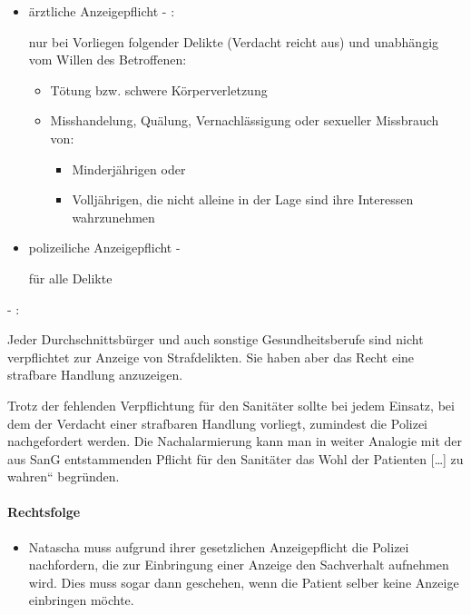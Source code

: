 \begin{itemize}
	\item {\mdseries
	ärztliche Anzeigepflicht - :}

	{\mdseries
	nur bei Vorliegen folgender Delikte (Verdacht reicht aus) und
	unabhängig vom Willen des Betroffenen:}

	\begin{itemize}
		\item {\mdseries
		T\"otung bzw. schwere K\"orperverletzung}

		\item {\mdseries
 		Misshandelung, Quälung, Vernachlässigung oder sexueller Missbrauch
		von:}

		\begin{itemize}
			\item {\mdseries
			Minderjährigen oder}

			\item {\mdseries
			Volljährigen, die nicht alleine in der Lage sind ihre Interessen
			wahrzunehmen}

		\end{itemize}
	\end{itemize}
	
	\item {\mdseries
	polizeiliche Anzeigepflicht - }

	{\mdseries
	f\"ur alle Delikte}

\end{itemize}

{\mdseries
{} - :}

Jeder Durchschnittsb\"urger und auch sonstige Gesundheitsberufe sind
nicht verpflichtet zur Anzeige von Strafdelikten. Sie haben aber das
Recht eine strafbare Handlung anzuzeigen. 

Trotz der fehlenden Verpflichtung f\"ur den Sanitäter sollte bei jedem
Einsatz, bei dem der Verdacht einer strafbaren Handlung vorliegt,
zumindest die Polizei nachgefordert werden. Die Nachalarmierung kann
man in weiter Analogie mit der aus  SanG
entstammenden Pflicht f\"ur den Sanitäter {\quotedblbase}das Wohl der
Patienten [{\dots}] zu wahren{\textquotedblleft} begr\"unden.

\paragraph*{Rechtsfolge}

\begin{itemize}

	\item {\mdseries\color[rgb]{0.0,0.0,0.5019608}
	Natascha muss aufgrund ihrer gesetzlichen Anzeigepflicht die Polizei
	nachfordern, die zur Einbringung einer Anzeige den Sachverhalt
	aufnehmen wird. Dies muss sogar dann geschehen, wenn die Patient selber
	keine Anzeige einbringen m\"ochte.}

\end{itemize}

